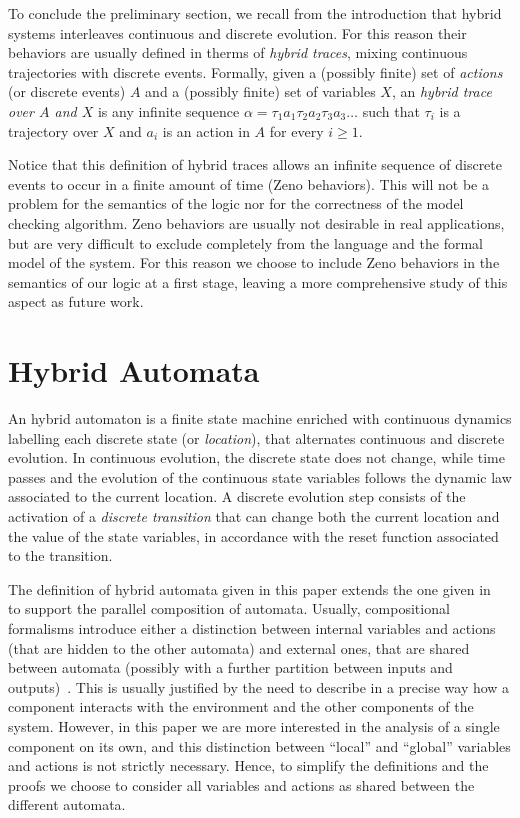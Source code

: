 \documentclass[submission,copyright,creativecommons]{eptcs}
\begin{document}
To conclude the preliminary section, we recall from the introduction that hybrid systems interleaves continuous and discrete evolution. For this reason their behaviors are usually defined in therms of \emph{hybrid traces}, mixing continuous trajectories with discrete events. Formally, given a (possibly finite) set of \emph{actions} (or discrete events) $A$ and a (possibly finite) set of variables $X$, an \emph{hybrid trace over $A$ and $X$} is any infinite sequence $\alpha = \tau_1 a_1 \tau_2 a_2 \tau_3 a_3 \ldots$ such that $\tau_i$ is a trajectory over $X$ and $a_i$ is an action in $A$ for every $i \geq 1$. 


Notice that this definition of hybrid traces allows an infinite sequence of discrete events to occur in a finite amount of time (Zeno behaviors). This will not be a problem for the semantics of the logic nor for the correctness of the model checking algorithm. Zeno behaviors are usually not desirable in real applications, but are very difficult to exclude completely from the language and the formal model of the system. For this reason we choose to include Zeno behaviors in the semantics of our logic at a first stage, leaving a more comprehensive study of this aspect as future work.

\section{Hybrid Automata}\label{sec:ha}

An hybrid automaton is a finite state machine enriched with continuous dynamics labelling each discrete state (or \emph{location}), that alternates continuous and discrete evolution. In continuous evolution, the discrete state does not change, while time passes and the evolution of the continuous state variables follows the dynamic law associated to the current location. A discrete evolution step consists of the activation of a \emph{discrete transition} that can change both the current location and the value of the state variables, in accordance with the reset function associated to the transition. 


The definition of hybrid automata given in this paper extends the one given in~\cite{Alur} to support the parallel composition of automata. Usually, compositional formalisms introduce either a distinction between internal variables and actions (that are hidden to the other automata) and external ones, that are shared between automata (possibly with a further partition between inputs and outputs)~\cite{Lynch03}. This is usually justified by the need to describe in a precise way how a component interacts with the environment and the other components of the system. However, in this paper we are more interested in the analysis of a single component on its own, and this distinction between ``local'' and ``global'' variables and actions is not strictly necessary. Hence, to simplify the definitions and the proofs we choose to consider all variables and actions as shared between the different automata. 
\end{document}
